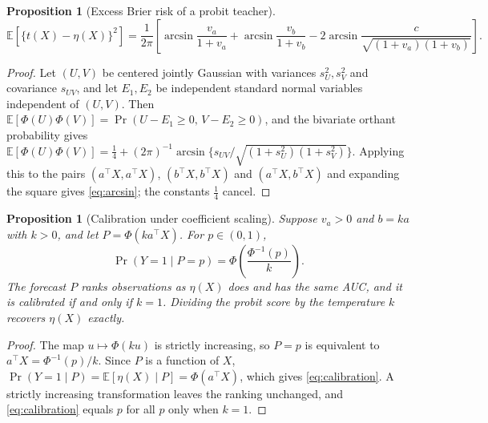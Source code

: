 \documentclass[11pt]{article}
\newtheorem{proposition}[theorem]{Proposition}
\theoremstyle{remark}
\newcommand{\E}{\mathbb E}
\newcommand{\1}{\mathbf 1}
\begin{document}
\begin{proposition}[Excess Brier risk of a probit teacher]\label{th:probit}
\begin{equation}\label{eq:arcsin}
\E[\{t(X)-\eta(X)\}^2]=\frac{1}{2\pi}\left[
\arcsin\frac{v_a}{1+v_a}+\arcsin\frac{v_b}{1+v_b}
-2\arcsin\frac{c}{\sqrt{(1+v_a)(1+v_b)}}\right].
\end{equation}
\end{proposition}
\begin{proof}
Let $(U,V)$ be centered jointly Gaussian with variances $s_U^2,s_V^2$ and covariance $s_{UV}$, and let $E_1,E_2$ be independent standard normal variables independent of $(U,V)$. Then $\E[\Phi(U)\Phi(V)]=\Pr(U-E_1\ge0,\,V-E_2\ge0)$, and the bivariate orthant probability \cite{sheppard} gives
$\E[\Phi(U)\Phi(V)]=\tfrac14+(2\pi)^{-1}\arcsin\{s_{UV}/\sqrt{(1+s_U^2)(1+s_V^2)}\}$.
Applying this to the pairs $(a^\top X,a^\top X)$, $(b^\top X,b^\top X)$ and $(a^\top X,b^\top X)$ and expanding the square gives \eqref{eq:arcsin}; the constants $\tfrac14$ cancel.
\end{proof}

\begin{proposition}[Calibration under coefficient scaling]\label{th:scale}
Suppose $v_a>0$ and $b=ka$ with $k>0$, and let $P=\Phi(ka^\top X)$. For $p\in(0,1)$,
\begin{equation}\label{eq:calibration}
\Pr(Y=1\mid P=p)=\Phi\left(\frac{\Phi^{-1}(p)}{k}\right).
\end{equation}
The forecast $P$ ranks observations as $\eta(X)$ does and has the same AUC, and it is calibrated if and only if $k=1$. Dividing the probit score by the temperature $k$ recovers $\eta(X)$ exactly.
\end{proposition}
\begin{proof}
The map $u\mapsto\Phi(ku)$ is strictly increasing, so $P=p$ is equivalent to $a^\top X=\Phi^{-1}(p)/k$. Since $P$ is a function of $X$, $\Pr(Y=1\mid P)=\E[\eta(X)\mid P]=\Phi(a^\top X)$, which gives \eqref{eq:calibration}. A strictly increasing transformation leaves the ranking unchanged, and \eqref{eq:calibration} equals $p$ for all $p$ only when $k=1$.
\end{proof}
\end{document}
